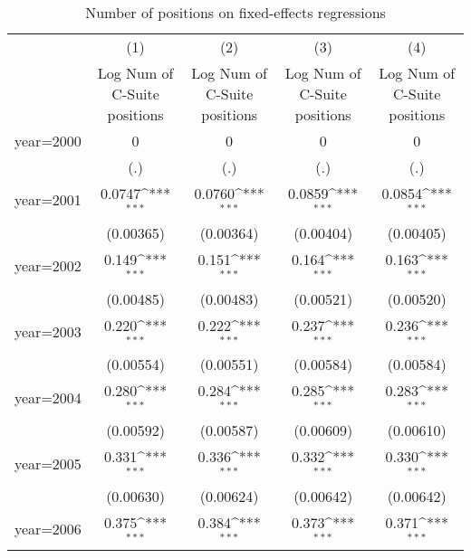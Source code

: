 \begin{table}[htbp]\centering
\def\sym#1{\ifmmode^{#1}\else\(^{#1}\)\fi}
\caption{Number of positions on fixed-effects regressions\label{tab1}}
\begin{tabular}{l*{4}{c}}
\toprule
                    &\multicolumn{1}{c}{(1)}&\multicolumn{1}{c}{(2)}&\multicolumn{1}{c}{(3)}&\multicolumn{1}{c}{(4)}\\
                    &\multicolumn{1}{c}{Log Num of C-Suite positions}&\multicolumn{1}{c}{Log Num of C-Suite positions}&\multicolumn{1}{c}{Log Num of C-Suite positions}&\multicolumn{1}{c}{Log Num of C-Suite positions}\\
\midrule
year=2000           &           0         &           0         &           0         &           0         \\
                    &         (.)         &         (.)         &         (.)         &         (.)         \\
\addlinespace
year=2001           &      0.0747\sym{***}&      0.0760\sym{***}&      0.0859\sym{***}&      0.0854\sym{***}\\
                    &   (0.00365)         &   (0.00364)         &   (0.00404)         &   (0.00405)         \\
\addlinespace
year=2002           &       0.149\sym{***}&       0.151\sym{***}&       0.164\sym{***}&       0.163\sym{***}\\
                    &   (0.00485)         &   (0.00483)         &   (0.00521)         &   (0.00520)         \\
\addlinespace
year=2003           &       0.220\sym{***}&       0.222\sym{***}&       0.237\sym{***}&       0.236\sym{***}\\
                    &   (0.00554)         &   (0.00551)         &   (0.00584)         &   (0.00584)         \\
\addlinespace
year=2004           &       0.280\sym{***}&       0.284\sym{***}&       0.285\sym{***}&       0.283\sym{***}\\
                    &   (0.00592)         &   (0.00587)         &   (0.00609)         &   (0.00610)         \\
\addlinespace
year=2005           &       0.331\sym{***}&       0.336\sym{***}&       0.332\sym{***}&       0.330\sym{***}\\
                    &   (0.00630)         &   (0.00624)         &   (0.00642)         &   (0.00642)         \\
\addlinespace
year=2006           &       0.375\sym{***}&       0.384\sym{***}&       0.373\sym{***}&       0.371\sym{***}\\

\end{tabular}
\end{table}
